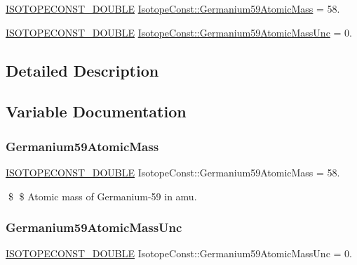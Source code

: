 \begin{DoxyCompactItemize}
\item 
\mbox{\hyperlink{group___isotope_const-_macros_ga8f45a7272ce02c0b4c65c44636ed719a}{I\+S\+O\+T\+O\+P\+E\+C\+O\+N\+S\+T\+\_\+\+D\+O\+U\+B\+LE}} \mbox{\hyperlink{group___isotope_const-_germanium-_ge59_ga0bba8cb984afd4a2b094da1b2d1033b9}{Isotope\+Const\+::\+Germanium59\+Atomic\+Mass}} = 58.
\item 
\mbox{\hyperlink{group___isotope_const-_macros_ga8f45a7272ce02c0b4c65c44636ed719a}{I\+S\+O\+T\+O\+P\+E\+C\+O\+N\+S\+T\+\_\+\+D\+O\+U\+B\+LE}} \mbox{\hyperlink{group___isotope_const-_germanium-_ge59_gabd83c8b90d063315e9913b8252e28a40}{Isotope\+Const\+::\+Germanium59\+Atomic\+Mass\+Unc}} = 0.
\end{DoxyCompactItemize}


\subsection{Detailed Description}


\subsection{Variable Documentation}
\mbox{\label{group___isotope_const-_germanium-_ge59_ga0bba8cb984afd4a2b094da1b2d1033b9}} 
\subsubsection{\texorpdfstring{Germanium59\+Atomic\+Mass}{Germanium59AtomicMass}}
{\footnotesize\ttfamily \mbox{\hyperlink{group___isotope_const-_macros_ga8f45a7272ce02c0b4c65c44636ed719a}{I\+S\+O\+T\+O\+P\+E\+C\+O\+N\+S\+T\+\_\+\+D\+O\+U\+B\+LE}} Isotope\+Const\+::\+Germanium59\+Atomic\+Mass = 58.}

\$ \$ Atomic mass of Germanium-\/59 in amu. \mbox{\label{group___isotope_const-_germanium-_ge59_gabd83c8b90d063315e9913b8252e28a40}} 
\subsubsection{\texorpdfstring{Germanium59\+Atomic\+Mass\+Unc}{Germanium59AtomicMassUnc}}
{\footnotesize\ttfamily \mbox{\hyperlink{group___isotope_const-_macros_ga8f45a7272ce02c0b4c65c44636ed719a}{I\+S\+O\+T\+O\+P\+E\+C\+O\+N\+S\+T\+\_\+\+D\+O\+U\+B\+LE}} Isotope\+Const\+::\+Germanium59\+Atomic\+Mass\+Unc = 0.}

